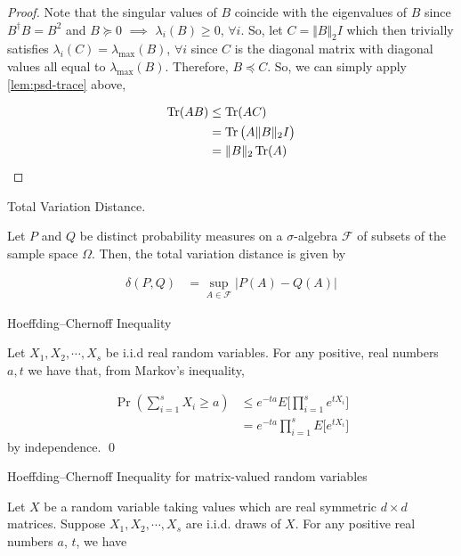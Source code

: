 \documentclass[main.tex]{subfiles}
\begin{document}
\begin{subappendices}
\begin{corollary}
\begin{proof}
Note that the singular values of $B$ coincide with the eigenvalues of $B$ since $B^\dag B = B^2$ and $B \succeq 0$ $\implies$ $\lambda_i(B) \geq 0$, $\forall i$. So, let $C = \Vert B \Vert_2 I$ which then trivially satisfies $\lambda_i(C) = \lambda_{\max}(B)$, $\forall i$ since $C$ is the diagonal matrix with diagonal values all equal to $\lambda_{\max}(B)$. Therefore, $B \preceq C$. So, we can simply apply \ref{lem:psd-trace} above,

\begin{align*}
\Tr(AB) &\leq \Tr(AC) \\
&= \Tr\big(A \Vert B \Vert_2 I\big)\\
&= \Vert B \Vert_2 \Tr(A)
\end{align*}
\end{proof}
\end{corollary}

\begin{definition} Total Variation Distance.
\label{def:tve}

Let $P$ and $Q$ be distinct probability measures on a $\sigma$-algebra $\mathcal{F}$ of subsets of the sample space $\Omega$. Then, the total variation distance is given by

\begin{align*}
\delta(P, Q) &= \sup_{A \in \mathcal{F}}\vert P(A) - Q(A)\vert
\end{align*}
\end{definition}

\begin{lemma}Hoeffding--Chernoff Inequality
\label{lem:chernoff}

Let $X_1, X_2, \cdots, X_s$	be i.i.d real random variables. For any positive, real numbers $a, t$ we have that, from Markov's inequality,

\begin{align*}
\Pr(\sum_{i=1}^s X_i \geq a) &\leq e^{-ta} E\Bigg[\prod_{i=1}^s e^{tX_i}\Bigg]\\
&= e^{-ta} \prod_{i=1}^s E\Bigg[e^{tX_i}\Bigg]
\end{align*}
by independence.
\qed
\end{lemma}

\begin{theorem}Hoeffding--Chernoff Inequality for matrix-valued random variables \cite{kannan2017randomized}
	
	Let $X$ be a random variable taking values which are real symmetric $d \times d$ matrices. Suppose $X_1, X_2, \cdots , X_s$ are i.i.d. draws of $X$. For any positive real numbers $a$, $t$, we have
	

\end{theorem}
\end{subappendices}
\end{document}
